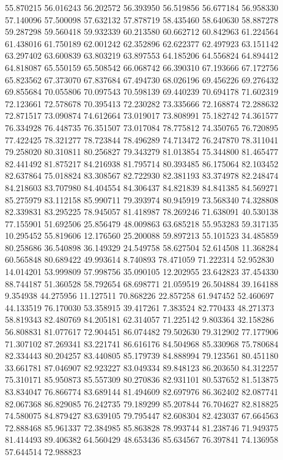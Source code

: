 55.870215
56.016243
56.202572
56.393950
56.519856
56.677184
56.958330
57.140096
57.500098
57.632132
57.878719
58.435460
58.640630
58.887278
59.287298
59.560418
59.932339
60.213580
60.662712
60.842963
61.224564
61.438016
61.750189
62.001242
62.352896
62.622377
62.497923
63.151142
63.297402
63.600839
63.803219
63.897553
64.185206
64.556824
64.894412
64.818087
65.550159
65.508542
66.068742
66.390310
67.193666
67.172756
65.823562
67.373070
67.837684
67.494730
68.026196
69.456226
69.276432
69.855684
70.055806
70.097543
70.598139
69.440239
70.694178
71.602319
72.123661
72.578678
70.395413
72.230282
73.335666
72.168874
72.288632
72.871517
73.090874
74.612664
73.019017
73.808991
75.182742
74.361577
76.334928
76.448735
76.351507
73.017084
78.775812
74.350765
76.720895
77.422425
78.321277
78.723844
78.496289
74.713472
76.247870
78.311041
79.258020
80.310811
80.256827
79.343279
81.013854
75.344800
81.465477
82.441492
81.875217
84.216938
81.795714
80.393485
86.175064
82.103452
82.637864
75.018824
83.308567
82.722930
82.381193
83.374978
82.248474
84.218603
83.707980
84.404554
84.306437
84.821839
84.841385
84.569271
85.275979
83.112158
85.990711
79.393974
80.945919
73.568340
74.328808
82.339831
83.295225
78.945057
81.418987
78.269246
71.638091
40.530138
77.155901
51.692506
25.856479
48.009863
63.685218
55.953283
59.317135
10.295452
55.819606
12.176560
25.200088
59.897213
55.101523
34.485859
80.258686
36.540898
36.149329
24.549758
58.627504
52.614508
11.368284
60.565848
80.689422
49.993614
8.740893
78.471059
71.222314
52.952830
14.014201
53.999809
57.998756
35.090105
12.202955
23.642823
37.454330
88.744187
51.360528
58.792654
68.698771
21.059519
26.504884
39.164188
9.354938
44.275956
11.127511
70.868226
22.857258
61.947452
52.460697
44.133519
76.170030
53.358915
39.417261
7.383524
82.770433
48.271373
58.819343
82.480769
84.205181
62.314057
71.225142
9.803364
32.158286
56.808831
81.077617
72.904451
86.074482
79.502630
79.312902
77.177906
71.307102
87.269341
83.221741
86.616176
84.504968
85.330968
75.780684
82.334443
80.204257
83.440805
85.179739
84.888994
79.123561
80.451180
33.661781
87.046907
82.923227
83.049334
89.848123
86.203650
84.312257
75.310171
85.950873
85.557309
80.270836
82.931101
80.537652
81.513875
83.834047
76.866774
83.689144
81.494609
82.697976
86.362402
82.087741
82.067368
86.829085
76.242735
79.189299
85.207844
76.704627
82.818825
74.580075
84.879427
83.639105
79.795447
82.608304
82.423037
67.664563
72.888468
85.961337
72.384985
85.863828
78.993744
81.238746
71.949375
81.414493
89.406382
64.560429
48.653436
85.634567
76.397841
74.136958
57.644514
72.988823
